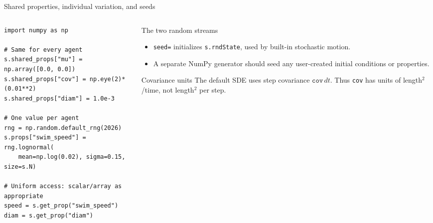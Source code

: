 \documentclass[aspectratio=169,11pt]{beamer}
\begin{document}
\begin{frame}[fragile]{Shared properties, individual variation, and seeds}
\begin{columns}[T,onlytextwidth]
\begin{column}{0.59\textwidth}
\begin{lstlisting}
import numpy as np

# Same for every agent
s.shared_props["mu"] = np.array([0.0, 0.0])
s.shared_props["cov"] = np.eye(2)*(0.01**2)
s.shared_props["diam"] = 1.0e-3

# One value per agent
rng = np.random.default_rng(2026)
s.props["swim_speed"] = rng.lognormal(
    mean=np.log(0.02), sigma=0.15, size=s.N)

# Uniform access: scalar/array as appropriate
speed = s.get_prop("swim_speed")
diam = s.get_prop("diam")
\end{lstlisting}
\end{column}
\begin{column}{0.37\textwidth}
\begin{block}{The two random streams}
\begin{itemize}\itemsep3pt
  \item \texttt{seed=} initializes \texttt{s.rndState}, used by built-in stochastic motion.
  \item A separate NumPy generator should seed any user-created initial conditions or properties.
\end{itemize}
\end{block}
\begin{alertblock}{Covariance units}
The default SDE uses step covariance \(\texttt{cov}\,dt\). Thus \texttt{cov} has units of length\(^2\)/time, not length\(^2\) per step.
\end{alertblock}
\end{column}
\end{columns}
\end{frame}
\end{document}
